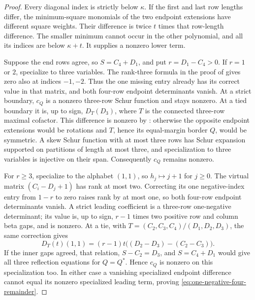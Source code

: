 \documentclass[11pt,a4paper]{amsart}
\numberwithin{equation}{section}
\theoremstyle{plain}
\theoremstyle{definition}
\begin{document}
\begin{proof}
Every diagonal index is strictly below \(\kappa\).  If the first and
last row lengths differ, the minimum-square monomials of the two endpoint
extensions have different square weights.  Their difference is twice
\(t\) times that row-length difference.  The smaller minimum cannot
occur in the other polynomial, and all its indices are below
\(\kappa+t\).  It supplies a nonzero lower term.

Suppose the end rows agree, so \(S=C_4+D_1\), and put
\(r=D_1-C_4>0\).  If \(r=1\) or \(2\), specialize to three
variables.  The rank-three formula in the proof of
 gives zero also at indices \(-1,-2\).
Thus the one missing entry already has its correct value in that matrix,
and both four-row endpoint determinants vanish.  At a strict boundary,
\(c_Q\) is a nonzero three-row Schur function and stays nonzero.
At a tied boundary it is, up to sign, \(D_T(D_3)\), where \(T\) is
the connected three-row maximal cofactor.  This difference is nonzero by
: otherwise the opposite endpoint extensions would
be rotations and \(T\), hence its equal-margin border \(Q\), would
be symmetric.  A skew Schur function with at most three rows has Schur
expansion supported on partitions of length at most three, and
specialization to three variables is injective on their span.
Consequently \(c_Q\) remains nonzero.

For \(r\ge3\), specialize to the alphabet \((1,1)\), so
\(h_j\mapsto j+1\) for \(j\ge0\).  The virtual matrix
\((C_i-D_j+1)\) has rank at most two.  Correcting its one negative-index
entry from \(1-r\) to zero raises rank by at most one, so both
four-row endpoint determinants vanish.  A strict leading coefficient is
a three-row one-negative determinant; its value is, up to sign,
\(r-1\) times two positive row and column beta gaps, and is nonzero.
At a tie, with \(T=(C_2,C_3,C_4)/(D_1,D_2,D_3)\), the same correction gives
\begin{equation}\label{eq:one-negative-two-variable}
 D_T(t)(1,1)=(r-1)t\bigl((D_2-D_3)-(C_2-C_3)\bigr).
\end{equation}
If the inner gaps agreed, that relation, \(S-C_2=D_3\), and
\(S=C_4+D_1\) would give all three reflection equations for
\(Q=Q^*\).  Hence \(c_Q\) is nonzero on this specialization too.
In either case a vanishing specialized endpoint difference cannot equal
its nonzero specialized leading term, proving
\eqref{eq:one-negative-four-remainder}.
\end{proof}
\end{document}
